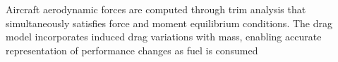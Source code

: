 Aircraft aerodynamic forces are computed through trim analysis that simultaneously
satisfies force and moment equilibrium conditions. The drag model incorporates induced
drag variations with mass, enabling accurate representation of performance changes as
fuel is consumed
